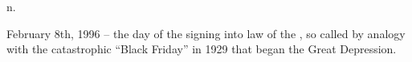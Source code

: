  n.

February 8th, 1996 -- the day of the signing into law of the , so
called by analogy with the catastrophic ``Black Friday'' in 1929 that began the
Great Depression.

